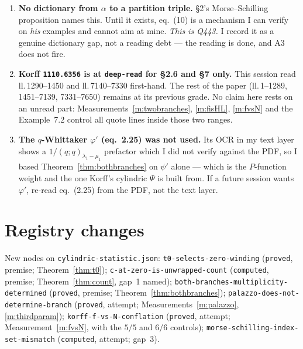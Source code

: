 \documentclass[11pt]{article}
\theoremstyle{plain}
\theoremstyle{definition}
\begin{document}
\begin{enumerate}
\smallskip
\noindent The forward direction looks nearly immediate --- $|\lambda|=n$ forces
$\lambda_1\le n$, hence $\lambda_1-\lambda_{2k}\le\lambda_1\le n\le w$ --- but it turns on
which of $\lambda,\lambda'$ carries the content $\alpha$ in
$s_{\lambda[2k,w]'}$, and I have not checked that, so it stays a conjecture here.
The $k=1$ rows are \emph{not} sharp ($w=2$ survives to $n=5$), so a sharp statement at
$k=1$ needs the two-row structure and is a separate question.

\item \textbf{No dictionary from $\alpha$ to a partition triple.} \S2's Morse--Schilling
proposition names this. Until it exists, eq.~(10) is a mechanism I can verify on \emph{his}
examples and cannot aim at mine. \emph{This is Q443.} I record it as a genuine dictionary gap,
not a reading debt --- the reading is done, and A3 does not fire.

\item \textbf{Korff \texttt{1110.6356} is at \texttt{deep-read} for \S2.6 and \S7 only.}
This session read ll.\,1290--1450 and ll.\,7140--7330 first-hand. The rest of the paper
(ll.\,1--1289, 1451--7139, 7331--7650) remains at its previous grade. No claim here rests on
an unread part: Measurements~\ref{m:twobranches}, \ref{m:fisHL}, \ref{m:fvsN} and the
Example~7.2 control all quote lines inside those two ranges.

\item \textbf{The $q$-Whittaker $\varphi'$ (eq.~2.25) was not used.} Its OCR in my text layer
shows a $1/(q;q)_{\lambda_1-\mu_1}$ prefactor which I did not verify against the PDF, so I
based Theorem~\ref{thm:bothbranches} on $\psi'$ alone --- which is the $P$-function weight and
the one Korff's cylindric $\Psi$ is built from. If a future session wants $\varphi'$, re-read
eq.~(2.25) from the PDF, not the text layer.
\end{enumerate}

\section{Registry changes}

New nodes on \texttt{cylindric-statistic.json}:
\texttt{t0-selects-zero-winding} (\texttt{proved}, premise; Theorem~\ref{thm:t0});
\texttt{c-at-zero-is-unwrapped-count} (\texttt{computed}, premise; Theorem~\ref{thm:count},
gap~1 named); \texttt{both-branches-multiplicity-determined} (\texttt{proved}, premise;
Theorem~\ref{thm:bothbranches}); \texttt{palazzo-does-not-determine-branch}
(\texttt{proved}, attempt; Measurements~\ref{m:palazzo}, \ref{m:thirdparam});
\texttt{korff-f-vs-N-conflation} (\texttt{proved}, attempt; Measurement~\ref{m:fvsN}, with the
$5/5$ and $6/6$ controls); \texttt{morse-schilling-index-set-mismatch}
(\texttt{computed}, attempt; gap~3).
\end{document}
